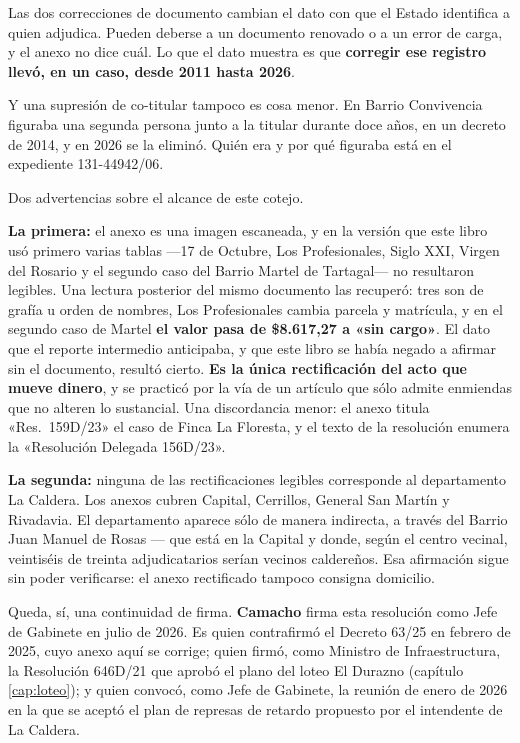 Las dos correcciones de documento cambian el dato con que el Estado identifica a quien adjudica. Pueden deberse a un documento renovado o a un error de carga, y el anexo no dice cuál. Lo que el dato muestra es que \textbf{corregir ese registro llevó, en un caso, desde 2011 hasta 2026}.

Y una supresión de co-titular tampoco es cosa menor. En Barrio Convivencia figuraba una segunda persona junto a la titular durante doce años, en un decreto de 2014, y en 2026 se la eliminó. Quién era y por qué figuraba está en el expediente 131-44942/06.

\begin{cautela}
Dos advertencias sobre el alcance de este cotejo.

\textbf{La primera:} el anexo es una imagen escaneada, y en la versión que este libro usó primero varias tablas ---17 de Octubre, Los Profesionales, Siglo XXI, Virgen del Rosario y el segundo caso del Barrio Martel de Tartagal--- no resultaron legibles. Una lectura posterior del mismo documento las recuperó: tres son de grafía u orden de nombres, Los Profesionales cambia parcela y matrícula, y en el segundo caso de Martel \textbf{el valor pasa de \$8.617,27 a «sin cargo»}. El dato que el reporte intermedio anticipaba, y que este libro se había negado a afirmar sin el documento, resultó cierto. \textbf{Es la única rectificación del acto que mueve dinero}, y se practicó por la vía de un artículo que sólo admite enmiendas que no alteren lo sustancial. Una discordancia menor: el anexo titula «Res.\ 159D/23» el caso de Finca La Floresta, y el texto de la resolución enumera la «Resolución Delegada 156D/23».

\textbf{La segunda:} ninguna de las rectificaciones legibles corresponde al departamento La Caldera. Los anexos cubren Capital, Cerrillos, General San Martín y Rivadavia. El departamento aparece sólo de manera indirecta, a través del Barrio Juan Manuel de Rosas --- que está en la Capital y donde, según el centro vecinal, veintiséis de treinta adjudicatarios serían vecinos caldereños. Esa afirmación sigue sin poder verificarse: el anexo rectificado tampoco consigna domicilio.
\end{cautela}

Queda, sí, una continuidad de firma. \textbf{Camacho} firma esta resolución como Jefe de Gabinete en julio de 2026. Es quien contrafirmó el Decreto 63/25 en febrero de 2025, cuyo anexo aquí se corrige; quien firmó, como Ministro de Infraestructura, la Resolución 646D/21 que aprobó el plano del loteo El Durazno (capítulo \ref{cap:loteo}); y quien convocó, como Jefe de Gabinete, la reunión de enero de 2026 en la que se aceptó el plan de represas de retardo propuesto por el intendente de La Caldera.

